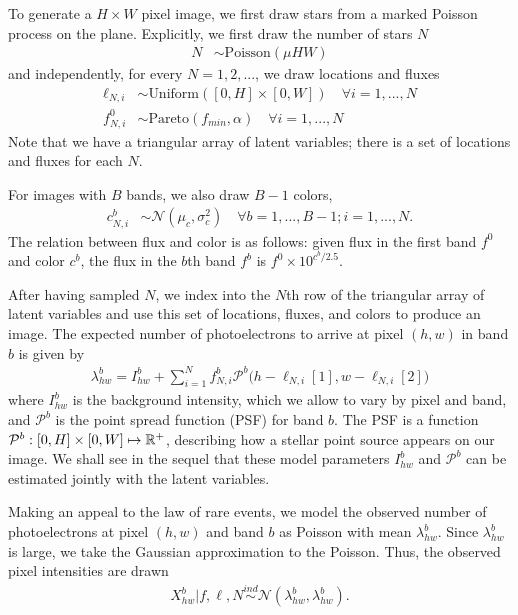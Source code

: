 To generate a $H \times W$ pixel image, we first draw stars from a marked Poisson process
on the plane. Explicitly, we first draw the number of stars $N$
\begin{align}
	N &\sim \text{Poisson}(\mu HW)
\end{align}
and independently, for every $N = 1, 2, ... $, we draw locations and fluxes
\begin{align}
  \ell_{N, i} &\sim \text{Uniform}([0, H] \times [0, W]) \quad \forall i = 1, ..., N \\
  f_{N, i}^{0} & \sim \text{Pareto}(f_{min}, \alpha) \quad \forall i = 1, ..., N
\end{align}
Note that we have a triangular array of latent variables; there is a set of
locations and fluxes for each $N$.

For images with $B$ bands, we also draw $B - 1$ colors,
\begin{align}
  c_{N, i}^{b}  & \sim \mathcal{N}(\mu_c, \sigma^2_c) \quad \forall b = 1, ..., B - 1; i = 1, ..., N.
\end{align}
The relation between flux and color is as follows: 
given flux in the first band $f^0$ and color $c^b$, 
the flux in the $b$th band $f^b$ is $f^0 \times 10^{c^b / 2.5}$.

After having sampled $N$,
we index into the $N$th row of the triangular array of latent variables
and use this set of locations, fluxes, and colors to produce an image.
The expected number of photoelectrons to arrive at pixel $(h,w)$ in band $b$ is given by
\begin{align}
  \lambda^b_{hw} = I^{b}_{hw} + \sum_{i = 1}^N f_{N, i}^b \mathcal{P}^b\big(h - \ell_{N, i}[1], w - \ell_{N,i}[2]\big)
  \label{eq:expected_intensity}
\end{align}
where $I^{b}_{hw}$ is the background intensity, which we allow to vary by pixel and band,
and $\mathcal{P}^b$ is the point spread function (PSF) for band $b$. The PSF
is a function $\mathcal{P}^b : [0, H] \times [0, W] \mapsto \mathbb{R}^+$,
describing how a stellar point source appears
on our image. We shall see in the sequel that these model
parameters $I^{b}_{hw}$ and $\mathcal{P}^b$ can be estimated jointly with
the latent variables.

Making an appeal to the law of rare events, we model the
observed number of photoelectrons at pixel $(h,w)$ and band $b$ as Poisson
with mean $\lambda^b_{hw}$. Since $\lambda^b_{hw}$ is large,
we take the Gaussian approximation to the Poisson.
Thus, the observed pixel intensities are drawn
\begin{align}
  X_{hw}^b | f, \ell, N \overset{ind}{\sim} \mathcal{N}(\lambda^b_{hw}, \lambda^b_{hw}).
\end{align}

